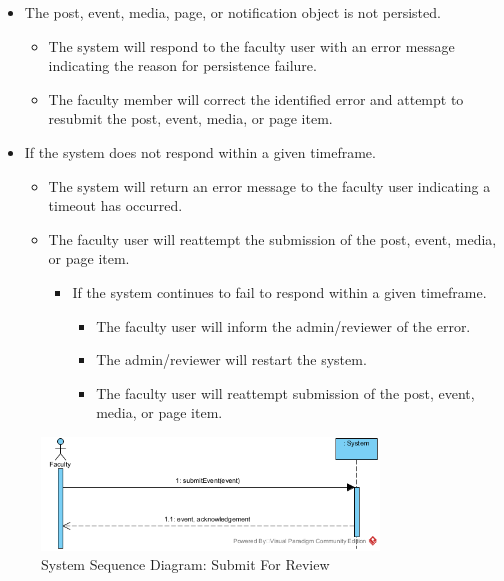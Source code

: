 \documentclass{article}
\begin{document}
\begin{itemize}
    \item The post, event, media, page, or notification object is not persisted.
    \begin{itemize}
        \item The system will respond to the faculty user with an error message indicating the reason for persistence failure.
        \item The faculty member will correct the identified error and attempt to resubmit the post, event, media, or page item.
    \end{itemize}
    \item If the system does not respond within a given timeframe.
    \begin{itemize}
        \item The system will return an error message to the faculty user indicating a timeout has occurred.
        \item The faculty user will reattempt the submission of the post, event, media, or page item.
        \begin{itemize}
            \item If the system continues to fail to respond within a given timeframe.
            \begin{itemize}
                \item The faculty user will inform the admin/reviewer of the error.
                \item The admin/reviewer will restart the system.
                \item The faculty user will reattempt submission of the post, event, media, or page item.
            \end{itemize}
        \end{itemize}
    \end{itemize}
\end{itemize}

\begin{figure}[H]
    \centering
    \includegraphics[width=0.8\textwidth]{images/SSD-UC08-SubmitForReview.png}
    \centering
    \caption{System Sequence Diagram: Submit For Review}
\end{figure}
\end{document}
